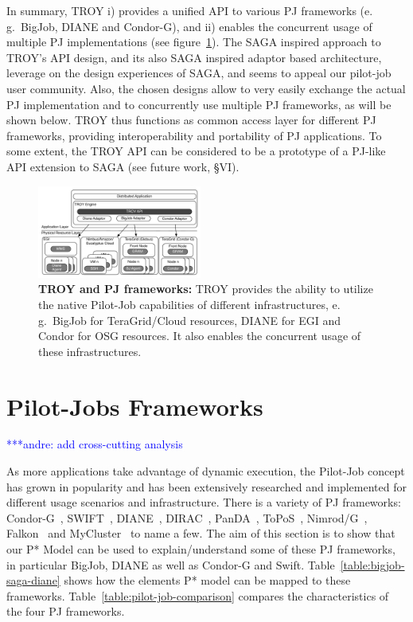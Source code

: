 \documentclass[conference,final]{IEEEtran}
\newcommand{\alnote}[1]{ {\textcolor{blue} { ***andre: #1 }}}
\newcommand{\alnote}[1]{}
\newcommand{\upp}{\vspace*{-0.5em}}
\begin{document}
In summary, TROY i) provides a unified API to various PJ frameworks (e.\,g.\
BigJob, DIANE and Condor-G), and ii) enables the concurrent usage of multiple PJ
implementations (see figure~\ref{fig:figures_distributed_pilot_job}). The SAGA
inspired approach to TROY's API design, and its also SAGA inspired adaptor based
architecture, leverage on the design experiences of SAGA, and seems to appeal
our pilot-job user community. Also, the chosen designs allow to very easily
exchange the actual PJ implementation and to concurrently use multiple PJ
frameworks, as will be shown below. TROY thus functions as common access layer
for different PJ frameworks, providing interoperability and portability of PJ
applications. To some extent, the TROY API can be considered to be a prototype
of a PJ-like API extension to SAGA (see future work, \S{VI}).



\begin{figure}[t]
    \centering
    \includegraphics[width=0.48\textwidth]{figures/distributed_pilot_job.pdf}
    \caption{\textbf{TROY and PJ frameworks:}
      TROY provides the ability to utilize the native Pilot-Job capabilities of 
      different infrastructures, e.\,g.\ BigJob for TeraGrid/Cloud resources, 
      DIANE for EGI and Condor for OSG resources. It also enables the concurrent
      usage of these infrastructures.}
    \label{fig:figures_distributed_pilot_job}
\end{figure}



\section{Pilot-Jobs Frameworks\upp\upp}
\alnote{add cross-cutting analysis}

As more applications take advantage of dynamic execution, the
Pilot-Job concept has grown in popularity and has been extensively
researched and implemented for different usage scenarios and
infrastructure. There is a variety of PJ frameworks:
Condor-G~\cite{condor-g}, SWIFT~\cite{Wilde2011},
DIANE~\cite{Moscicki:908910}, DIRAC~\cite{1742-6596-219-6-062049},
PanDA~\cite{1742-6596-219-6-062041}, ToPoS~\cite{topos},
Nimrod/G~\cite{10.1109/HPC.2000.846563}, Falkon~\cite{1362680} and
MyCluster~\cite{1652061} to name a few. The aim of this section is to
show that our P* Model can be used to explain/understand some of these
PJ frameworks, in particular BigJob, DIANE as well as Condor-G and
Swift.  Table~\ref{table:bigjob-saga-diane} shows how the elements P*
model can be mapped to these
frameworks. Table~\ref{table:pilot-job-comparison} compares the
characteristics of the four PJ frameworks.
\end{document}

